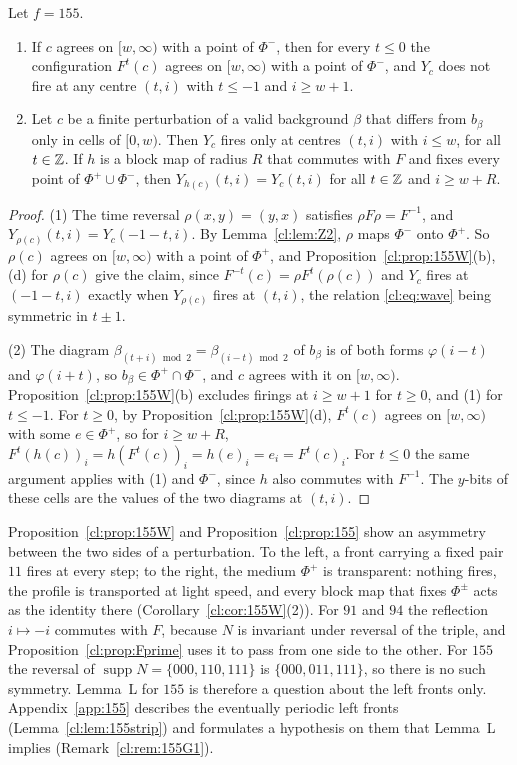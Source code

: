 \begin{corollary}\label{cl:cor:155W}
Let $f=155$.
\begin{enumerate}
\item[(1)] If $c$ agrees on $[w,\infty)$ with a point of $\Phi^-$, then for every $t\le0$ the configuration $F^t(c)$ agrees on $[w,\infty)$ with a point of $\Phi^-$, and $Y_c$ does not fire at any centre $(t,i)$ with $t\le-1$ and $i\ge w+1$.
\item[(2)] Let $c$ be a finite perturbation of a valid background $\beta$ that differs from $b_\beta$ only in cells of $[0,w)$. Then $Y_c$ fires only at centres $(t,i)$ with $i\le w$, for all $t\in\mathbb{Z}$. If $h$ is a block map of radius $R$ that commutes with $F$ and fixes every point of $\Phi^+\cup\Phi^-$, then $Y_{h(c)}(t,i)=Y_c(t,i)$ for all $t\in\mathbb{Z}$ and $i\ge w+R$.
\end{enumerate}
\end{corollary}

\begin{proof}
(1) The time reversal $\rho(x,y)=(y,x)$ satisfies $\rho F\rho=F^{-1}$, and $Y_{\rho(c)}(t,i)=Y_c(-1-t,i)$. By Lemma~\ref{cl:lem:Z2}, $\rho$ maps $\Phi^-$ onto $\Phi^+$. So $\rho(c)$ agrees on $[w,\infty)$ with a point of $\Phi^+$, and Proposition~\ref{cl:prop:155W}(b),(d) for $\rho(c)$ give the claim, since $F^{-t}(c)=\rho F^t(\rho(c))$ and $Y_c$ fires at $(-1-t,i)$ exactly when $Y_{\rho(c)}$ fires at $(t,i)$, the relation \eqref{cl:eq:wave} being symmetric in $t\pm1$.

(2) The diagram $\beta_{(t+i)\bmod2}=\beta_{(i-t)\bmod2}$ of $b_\beta$ is of both forms $\varphi(i-t)$ and $\varphi(i+t)$, so $b_\beta\in\Phi^+\cap\Phi^-$, and $c$ agrees with it on $[w,\infty)$. Proposition~\ref{cl:prop:155W}(b) excludes firings at $i\ge w+1$ for $t\ge0$, and (1) for $t\le-1$. For $t\ge0$, by Proposition~\ref{cl:prop:155W}(d), $F^t(c)$ agrees on $[w,\infty)$ with some $e\in\Phi^+$, so for $i\ge w+R$, $F^t(h(c))_i=h(F^t(c))_i=h(e)_i=e_i=F^t(c)_i$. For $t\le0$ the same argument applies with (1) and $\Phi^-$, since $h$ also commutes with $F^{-1}$. The $y$-bits of these cells are the values of the two diagrams at $(t,i)$.
\end{proof}

Proposition~\ref{cl:prop:155W} and Proposition~\ref{cl:prop:155} show an asymmetry between the two sides of a perturbation. To the left, a front carrying a fixed pair $11$ fires at every step; to the right, the medium $\Phi^+$ is transparent: nothing fires, the profile is transported at light speed, and every block map that fixes $\Phi^\pm$ acts as the identity there (Corollary~\ref{cl:cor:155W}(2)). For $91$ and $94$ the reflection $i\mapsto-i$ commutes with $F$, because $N$ is invariant under reversal of the triple, and Proposition~\ref{cl:prop:Fprime} uses it to pass from one side to the other. For $155$ the reversal of $\operatorname{supp}N=\{000,110,111\}$ is $\{000,011,111\}$, so there is no such symmetry. Lemma~L for $155$ is therefore a question about the left fronts only. Appendix~\ref{app:155} describes the eventually periodic left fronts (Lemma~\ref{cl:lem:155strip}) and formulates a hypothesis on them that Lemma~L implies (Remark~\ref{cl:rem:155G1}).
